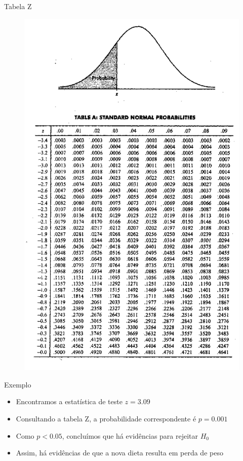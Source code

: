 \documentclass{beamer}
\begin{document}
\begin{frame}{Tabela Z}
  \begin{figure}
    \centering
      \includegraphics[height=0.9\textheight]{TH_II/z_table}
  \end{figure}
\end{frame}

\begin{frame}{Exemplo}
  \begin{example}
    \begin{itemize}
    \item Encontramos a estatística de teste $z=3.09$
    \item Consultando a tabela Z, a probabilidade correspondente é
      $p=0.001$
    \item Como $p<0.05$, concluímos que há evidências para rejeitar $H_0$
    \item Assim, há evidências de que a nova dieta resulta em perda de
      peso
    \end{itemize}
  \end{example}
\end{frame}
\end{document}
